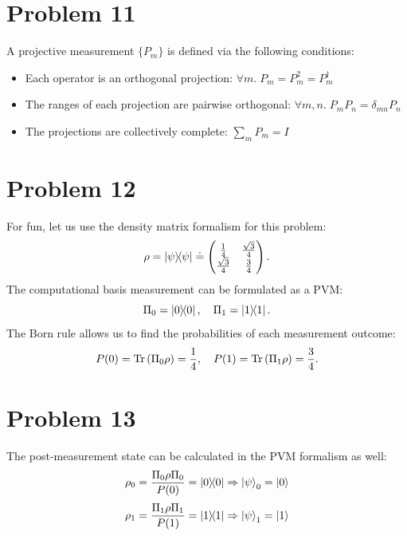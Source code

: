 \documentclass[11pt]{article}
\begin{document}
\section*{Problem 11}
A projective measurement $\{P_m\}$ is defined via the following conditions:
\begin{itemize}
    \item Each operator is an orthogonal projection:
        $\forall m.\; P_m = P_m^2 = P_m^\dagger$

    \item The ranges of each projection are pairwise orthogonal:
        $\forall m, n.\; P_m P_n = \delta_{mn} P_n$

    \item The projections are collectively complete:
        $\sum_m P_m = I$
\end{itemize}

\section*{Problem 12}
For fun, let us use the density matrix formalism for this problem:
\[
    \rho = \ketbra{\psi}{\psi} \doteq \begin{pmatrix}
        \frac{1}{4} & \frac{\sqrt{3}}{4} \\ \frac{\sqrt{3}}{4} & \frac{3}{4}
    \end{pmatrix}.
\]
The computational basis measurement can be formulated as a PVM:
\[
    \Pi_0 = \ketbra{0}{0},\quad
    \Pi_1 = \ketbra{1}{1}.
\]
The Born rule allows us to find the probabilities of each measurement outcome:
\[
    P(0) = \operatorname{Tr}\left(\Pi_0 \rho\right) = \frac{1}{4},\quad
    P(1) = \operatorname{Tr}\left(\Pi_1 \rho\right) = \frac{3}{4}.
\]

\section*{Problem 13}
The post-measurement state can be calculated in the PVM formalism as well:
\[
    \rho_0 = \frac{\Pi_0 \rho \Pi_0}{P(0)} = \ketbra{0}{0}
    \Rightarrow \ket{\psi}_0 = \ket{0}
\]
\[
    \rho_1 = \frac{\Pi_1 \rho \Pi_1}{P(1)} = \ketbra{1}{1}
    \Rightarrow \ket{\psi}_1 = \ket{1}
\]
\end{document}
